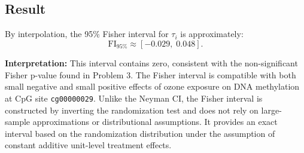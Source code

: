 \documentclass[11pt]{article}
\begin{document}
\subsection*{Result}

By interpolation, the 95\% Fisher interval for $\tau_i$ is approximately:
\[
  \boxed{\text{FI}_{95\%} \approx [-0.029,\; 0.048].}
\]

\textbf{Interpretation:} This interval contains zero, consistent with the non-significant Fisher p-value found in Problem 3. The Fisher interval is compatible with both small negative and small positive effects of ozone exposure on DNA methylation at CpG site \texttt{cg00000029}. Unlike the Neyman CI, the Fisher interval is constructed by inverting the randomization test and does not rely on large-sample approximations or distributional assumptions. It provides an exact interval based on the randomization distribution under the assumption of constant additive unit-level treatment effects.
\end{document}

